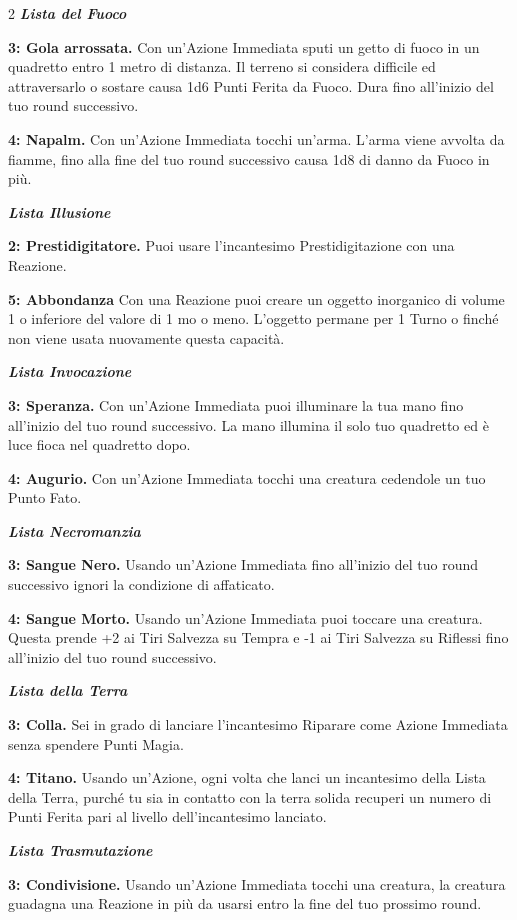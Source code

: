 \begin{multicols}{2}
\emph{\textbf{Lista del Fuoco}}

\textbf{3: Gola arrossata.} Con un'Azione Immediata sputi un getto di fuoco in un quadretto entro 1 metro di distanza. Il terreno si considera difficile ed attraversarlo o sostare causa 1d6 Punti Ferita da Fuoco. Dura fino all'inizio del tuo round successivo.

\textbf{4: Napalm.} Con un'Azione Immediata tocchi un'arma. L'arma viene avvolta da fiamme, fino alla fine del tuo round successivo causa 1d8 di danno da Fuoco in più.

\emph{\textbf{Lista Illusione}}

\textbf{2: Prestidigitatore.} Puoi usare l'incantesimo Prestidigitazione con una Reazione.

\textbf{5: Abbondanza} Con una Reazione puoi creare un oggetto inorganico di volume 1 o inferiore del valore di 1 mo o meno. L'oggetto permane per 1 Turno o finché non viene usata nuovamente questa capacità.

\emph{\textbf{Lista Invocazione}}

\textbf{3: Speranza.} Con un'Azione Immediata puoi illuminare la tua mano fino all'inizio del tuo round successivo. La mano illumina il solo tuo quadretto ed è luce fioca nel quadretto dopo.

\textbf{4: Augurio.} Con un'Azione Immediata tocchi una creatura cedendole un tuo Punto Fato.

\emph{\textbf{Lista Necromanzia}}

\textbf{3: Sangue Nero.} Usando un'Azione Immediata fino all'inizio del tuo round successivo ignori la condizione di affaticato.

\textbf{4: Sangue Morto.} Usando un'Azione Immediata puoi toccare una creatura. Questa prende +2 ai Tiri Salvezza su Tempra e -1 ai Tiri Salvezza su Riflessi fino all'inizio del tuo round successivo.

\emph{\textbf{Lista della Terra}}

\textbf{3: Colla.} Sei in grado di lanciare l'incantesimo Riparare come Azione Immediata senza spendere Punti Magia.

\textbf{4: Titano.} Usando un'Azione, ogni volta che lanci un incantesimo della Lista della Terra, purché tu sia in contatto con la terra solida recuperi un numero di Punti Ferita pari al livello dell'incantesimo lanciato.

\emph{\textbf{Lista Trasmutazione}}

\textbf{3: Condivisione.} Usando un'Azione Immediata tocchi una creatura, la creatura guadagna una Reazione in più da usarsi entro la fine del tuo prossimo round.


\end{multicols}
